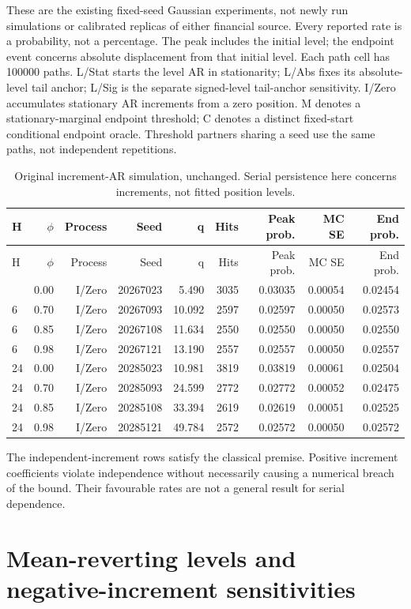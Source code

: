 \documentclass[11pt,a4paper]{article}
\begin{document}
These are the existing fixed-seed Gaussian experiments, not newly run
simulations or calibrated replicas of either financial source. Every reported
rate is a probability, not a percentage. The peak includes the initial level;
the endpoint event concerns absolute displacement from that initial level.
Each path cell has 100000 paths.
L/Stat starts the level AR in stationarity; L/Abs fixes its absolute-level
tail anchor; L/Sig is the separate signed-level tail-anchor sensitivity.
I/Zero accumulates stationary AR increments from a zero position.
M denotes a stationary-marginal endpoint threshold; C denotes a distinct
fixed-start conditional endpoint oracle. Threshold partners sharing a seed use
the same paths, not independent repetitions.
\begingroup
\scriptsize
\setlength{\tabcolsep}{3pt}
\renewcommand{\arraystretch}{1.12}
\begin{longtable}{lrrrrrrrr}
\caption{Original increment-AR simulation, unchanged. Serial persistence here concerns increments, not fitted position levels.}\\
\toprule
H & \(\phi\) & Process & Seed & q & Hits & Peak prob. & MC SE & End prob. \\
\midrule
\endfirsthead
\toprule
H & \(\phi\) & Process & Seed & q & Hits & Peak prob. & MC SE & End prob. \\
\midrule
\endhead
\bottomrule
\endfoot
6 & 0.00 & I/Zero & 20267023 & 5.490 & 3035 & 0.03035 & 0.00054 & 0.02454 \\
6 & 0.70 & I/Zero & 20267093 & 10.092 & 2597 & 0.02597 & 0.00050 & 0.02573 \\
6 & 0.85 & I/Zero & 20267108 & 11.634 & 2550 & 0.02550 & 0.00050 & 0.02550 \\
6 & 0.98 & I/Zero & 20267121 & 13.190 & 2557 & 0.02557 & 0.00050 & 0.02557 \\
24 & 0.00 & I/Zero & 20285023 & 10.981 & 3819 & 0.03819 & 0.00061 & 0.02504 \\
24 & 0.70 & I/Zero & 20285093 & 24.599 & 2772 & 0.02772 & 0.00052 & 0.02475 \\
24 & 0.85 & I/Zero & 20285108 & 33.394 & 2619 & 0.02619 & 0.00051 & 0.02525 \\
24 & 0.98 & I/Zero & 20285121 & 49.784 & 2572 & 0.02572 & 0.00050 & 0.02572 \\
\end{longtable}
\endgroup

The independent-increment rows satisfy the classical premise.
Positive increment coefficients violate independence without necessarily causing
a numerical breach of the bound. Their favourable rates are not a general
result for serial dependence.\section{Mean-reverting levels and negative-increment sensitivities}\label{sup:simulation-primary}
\end{document}
